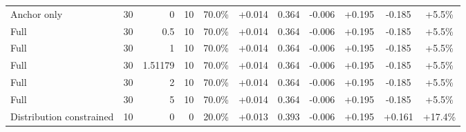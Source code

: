 \begin{table}[htbp]
\begin{tabular}{lrrrccccccc}
Anchor only & 30 & 0 & 10 & 70.0\% & +0.014 & 0.364 & -0.006 & +0.195 & -0.185 & +5.5\% \\
Full & 30 & 0.5 & 10 & 70.0\% & +0.014 & 0.364 & -0.006 & +0.195 & -0.185 & +5.5\% \\
Full & 30 & 1 & 10 & 70.0\% & +0.014 & 0.364 & -0.006 & +0.195 & -0.185 & +5.5\% \\
Full & 30 & 1.51179 & 10 & 70.0\% & +0.014 & 0.364 & -0.006 & +0.195 & -0.185 & +5.5\% \\
Full & 30 & 2 & 10 & 70.0\% & +0.014 & 0.364 & -0.006 & +0.195 & -0.185 & +5.5\% \\
Full & 30 & 5 & 10 & 70.0\% & +0.014 & 0.364 & -0.006 & +0.195 & -0.185 & +5.5\% \\
Distribution constrained & 10 & 0 & 0 & 20.0\% & +0.013 & 0.393 & -0.006 & +0.195 & +0.161 & +17.4\% \\
\bottomrule
\end{tabular}
\end{table}